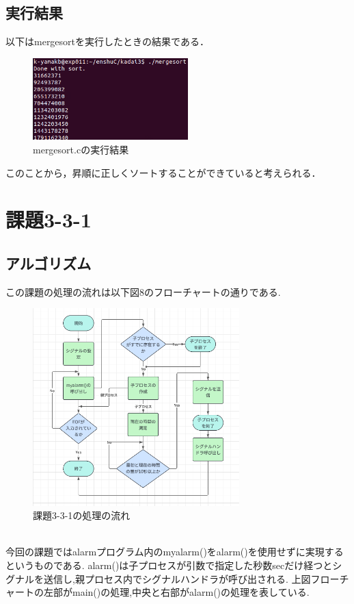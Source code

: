 \documentclass[dvipdfmx]{jarticle}
\begin{document}
\subsection{実行結果}
以下はmergesortを実行したときの結果である．
\begin{figure}[h]
    \centering
    \includegraphics[width=6cm]{result3-2-2.png}
    \caption{mergesort.cの実行結果}
\end{figure}
このことから，昇順に正しくソートすることができていると考えられる．
\section{課題3-3-1}
\subsection{アルゴリズム}
この課題の処理の流れは以下図8のフローチャートの通りである.
\begin{figure}[h]
    \centering
    \includegraphics[width=8cm]{3-3-1.png}
    \caption{課題3-3-1の処理の流れ}
\end{figure}
\\
今回の課題ではalarmプログラム内のmyalarm()をalarm()を使用せずに実現するというものである.
alarm()は子プロセスが引数で指定した秒数secだけ経つとシグナルを送信し,親プロセス内でシグナルハンドラが呼び出される.
上図フローチャートの左部がmain()の処理,中央と右部がalarm()の処理を表している.
\end{document}
